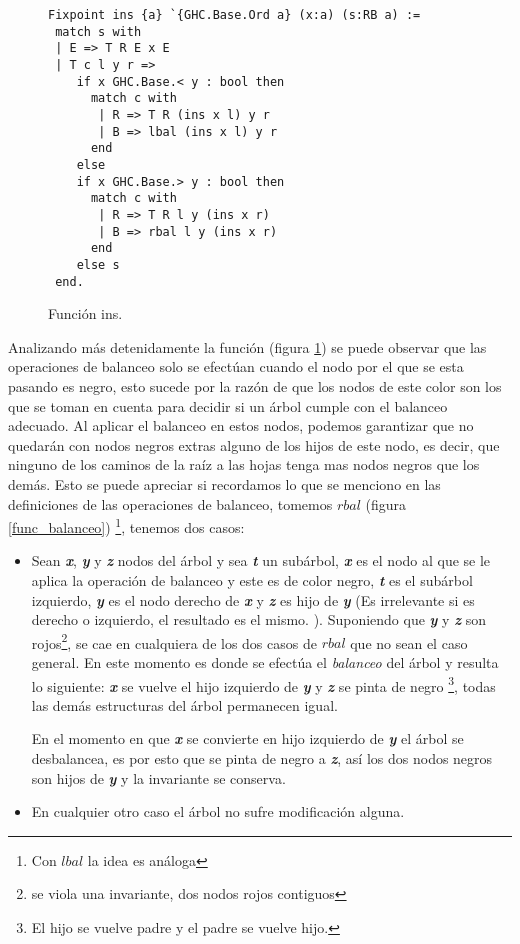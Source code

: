 \begin{figure}[!ht]
\centering
\captionsetup{justification=centering}
\begin{verbatim}
Fixpoint ins {a} `{GHC.Base.Ord a} (x:a) (s:RB a) :=
 match s with
 | E => T R E x E
 | T c l y r =>
    if x GHC.Base.< y : bool then
      match c with
       | R => T R (ins x l) y r
       | B => lbal (ins x l) y r
      end
    else
    if x GHC.Base.> y : bool then
      match c with
       | R => T R l y (ins x r)
       | B => rbal l y (ins x r)
      end
    else s
 end.
\end{verbatim}
\caption{Funci\'on ins.}
\label{func_ins}
\end{figure}

Analizando m\'as detenidamente la funci\'on (figura \ref{func_ins}) se puede observar que las
operaciones de balanceo solo se efectúan cuando el nodo por el que se esta pasando es negro, esto
sucede por la raz\'on de que los nodos de este color son los que se toman en cuenta para decidir si
un \'arbol cumple con el balanceo adecuado. Al aplicar el balanceo en estos nodos, podemos 
garantizar que no quedar\'an con nodos negros extras alguno de los hijos de este nodo, es decir, que
ninguno de los caminos de la ra\'iz a las hojas tenga mas nodos negros que los demás. Esto se puede
apreciar si recordamos lo que se menciono en las definiciones de las operaciones de balanceo, 
tomemos \hyperref[func_balanceo]{$rbal$} (figura \ref{func_balanceo})
\footnote{Con \hyperref[func_balanceo]{$lbal$} la idea es an\'aloga}, tenemos dos casos:

\begin{itemize}
    \item Sean \textbf{\textit{x}}, \textbf{\textit{y}} y \textbf{\textit{z}} nodos del \'arbol y 
    sea \textbf{\textit{t}} un subárbol, \textbf{\textit{x}} es el nodo al que se le aplica la 
    operaci\'on de balanceo y este es de color negro, \textbf{\textit{t}} es el subárbol izquierdo,
    \textbf{\textit{y}} es el nodo derecho de \textbf{\textit{x}} y \textbf{\textit{z}} es hijo de
    \textbf{\textit{y}} (Es irrelevante si es derecho o izquierdo, el resultado es el mismo.
    ). Suponiendo que \textbf{\textit{y}} y \textbf{\textit{z}} son rojos\footnote{se viola una 
    invariante, dos nodos rojos contiguos}, se cae en cualquiera de los dos casos de
    \hyperref[func_balanceo]{$rbal$} que no sean el caso general. En este momento es donde se 
    efectúa el \textit{balanceo} del árbol y resulta lo siguiente: \textbf{\textit{x}} se vuelve el 
    hijo izquierdo de \textbf{\textit{y}} y \textbf{\textit{z}} se pinta de negro \footnote{El hijo 
    se vuelve padre y el padre se vuelve hijo.}, todas las dem\'as estructuras del \'arbol 
    permanecen igual.

    En el momento en que \textbf{\textit{x}} se convierte en hijo izquierdo de \textbf{\textit{y}}
    el \'arbol se desbalancea, es por esto que se pinta de negro a \textbf{\textit{z}}, así los dos
    nodos negros son hijos de \textbf{\textit{y}} y la invariante se conserva.
    \item En cualquier otro caso el \'arbol no sufre modificaci\'on alguna.
\end{itemize}

